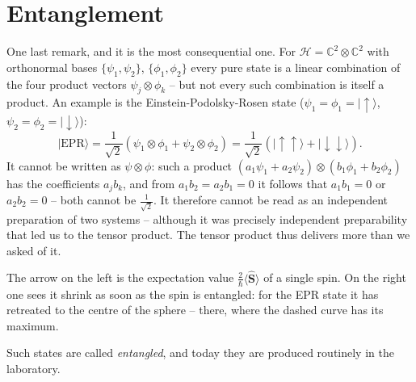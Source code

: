 \section*{Entanglement}
One last remark, and it is the most consequential one. For $\mathcal{H} = \mathbb{C}^2\otimes\mathbb{C}^2$ with orthonormal bases $\{\psi_1,\psi_2\}$, $\{\phi_1,\phi_2\}$ every pure state is a linear combination of the four product vectors $\psi_j\otimes\phi_k$ -- but not every such combination is itself a product. An example is the Einstein-Podolsky-Rosen state ($\psi_1=\phi_1=|\uparrow\rangle$, $\psi_2=\phi_2=|\downarrow\rangle$):
\begin{equation}
	|\text{EPR}\rangle = \frac{1}{\sqrt{2}}\left(\psi_1\otimes\phi_1 + \psi_2\otimes\phi_2\right) = \frac{1}{\sqrt{2}}\left(|\uparrow\uparrow\rangle + |\downarrow\downarrow\rangle\right).
\end{equation}
It cannot be written as $\psi\otimes\phi$: such a product $(a_1\psi_1+a_2\psi_2)\otimes(b_1\phi_1+b_2\phi_2)$ has the coefficients $a_jb_k$, and from $a_1b_2 = a_2b_1 = 0$ it follows that $a_1b_1 = 0$ or $a_2b_2 = 0$ -- both cannot be $\tfrac{1}{\sqrt{2}}$. It therefore cannot be read as an independent preparation of two systems -- although it was precisely independent preparability that led us to the tensor product. The tensor product thus delivers more than we asked of it.



The arrow on the left is the expectation value $\tfrac{2}{\hbar}\langle\widehat{\mathbf{S}}\rangle$ of a single spin. On the right one sees it shrink as soon as the spin is entangled: for the EPR state it has retreated to the centre of the sphere -- there, where the dashed curve has its maximum.

Such states are called \emph{entangled}, and today they are produced routinely in the laboratory.
